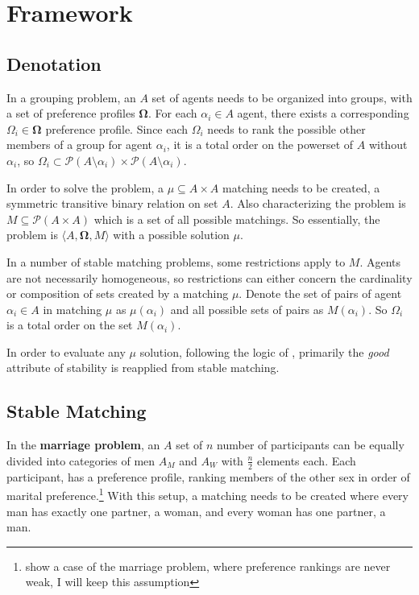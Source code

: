 \documentclass{elsarticle}
\begin{document}
\section{Framework}
\label{sec:framework}

\subsection{Denotation}

In a grouping problem, an $A$ set of agents needs to be organized into groups, with a set of preference profiles $\mathbf{\Omega}$. For each $\alpha_i \in A$ agent, there exists a corresponding $\Omega_i \in \mathbf{\Omega}$ preference profile. Since each $\Omega_i$ needs to rank the possible other members of a group for agent $\alpha_i$, it is a total order on the powerset of $A$ without $\alpha_i$, so $\Omega_i \subset \mathcal{P}(A\setminus \alpha_i) \times \mathcal{P}(A\setminus \alpha_i)$.

In order to solve the problem, a $\mu \subseteq A \times A$ matching needs to be created, a symmetric transitive binary relation on set $A$. Also characterizing the problem is $M \subseteq \mathcal{P}(A \times A)$ which is a set of all possible matchings. So essentially, the problem is $\langle A, \mathbf{\Omega}, M \rangle$ with a possible solution $\mu$.

In a number of stable matching problems, some restrictions apply to $M$. Agents are not necessarily homogeneous, so restrictions can either concern the cardinality or composition of sets created by a matching $\mu$. Denote the set of pairs of agent $\alpha_i \in A$ in matching $\mu$ as $\mu(\alpha_i)$ and all possible sets of pairs as $M(\alpha_i)$. So $\Omega_i$ is a total order on the set $M(\alpha_i)$.

In order to evaluate any $\mu$ solution, following the logic of \cite{budish12}, primarily the \textit{good} attribute of stability is reapplied from stable matching.

\subsection{Stable Matching}

In the \textbf{marriage problem}, an $A$ set of $n$ number of participants can be equally divided into categories of men $A_M$ and $A_W$ with $\frac{n}{2}$ elements each. Each participant, has a preference profile, ranking members of the other sex in order of marital preference.\footnote{ \cite{galeshapley62} show a case of the marriage problem, where preference rankings are never weak, I will keep this assumption} With this setup, a matching needs to be created where every man has exactly one partner, a woman, and every woman has one partner, a man.
\end{document}
